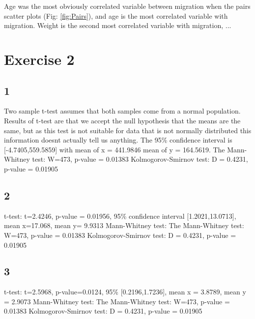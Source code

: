 \documentclass{article}
\begin{document}
    Age was the most obviously correlated variable between migration when the pairs scatter plots (Fig: \ref{fig:Pairs}), and age is the most correlated variable with migration.
    Weight is the second most correlated variable with migration, ...
    
    \section{Exercise 2}
    \subsection*{1}
    
    Two sample t-test assumes that both samples come from a normal population.
    Results of t-test are that we accept the null hypothesis that the means are the same, but as this test is not suitable for data that is not normally distributed this information doesnt actually tell us anything. The 95\% confidence interval is [-4.7405,559.5859] with mean of x = 441.9846 mean of y = 164.5619.
    The Mann-Whitney test: W=473, p-value = 0.01383
    Kolmogorov-Smirnov test: D = 0.4231, p-value = 0.01905
    
    \subsection*{2}
    t-test: t=2.4246, p-value = 0.01956, 95\% confidence interval [1.2021,13.0713], mean x=17.068, mean y= 9.9313
    Mann-Whitney test: The Mann-Whitney test: W=473, p-value = 0.01383
    Kolmogorov-Smirnov test: D = 0.4231, p-value = 0.01905
    
    \subsection*{3}
    t-test: t=2.5968, p-value=0.0124, 95\% [0.2196,1.7236], mean x = 3.8789, mean y = 2.9073
    Mann-Whitney test: The Mann-Whitney test: W=473, p-value = 0.01383
    Kolmogorov-Smirnov test: D = 0.4231, p-value = 0.01905
    
\end{document}
